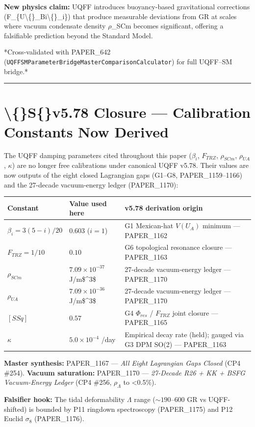 \documentclass[11pt]{article}
\begin{document}
\textbf{New physics claim:} UQFF introduces buoyancy-based gravitational corrections (F\_\{U\textbackslash\{\}\_Bi\textbackslash\{\}\_i\}) that produce measurable deviations from GR at scales where vacuum condensate density $\rho$\_SCm becomes significant, offering a falsifiable prediction beyond the Standard Model.

*Cross-validated with PAPER\_642 (\verb|UQFFSMParameterBridgeMasterComparisonCalculator|) for full UQFF--SM bridge.*

\noindent\rule{\textwidth}{0.4pt}

\section*{\textbackslash\{\}S\{\}v5.78 Closure --- Calibration Constants Now Derived}

The UQFF damping parameters cited throughout this paper ($\beta_i$, $F_{TRZ}$, $\rho_{SCm}$, $\rho_{UA}$, $\kappa$) are no longer free calibrations under canonical UQFF v5.78. Their values are now outputs of the eight closed Lagrangian gaps (G1--G8, PAPER\_1159--1166) and the 27-decade vacuum-energy ledger (PAPER\_1170):

\begin{center}
\begin{longtable}{lll}
\toprule
Constant & Value used here & v5.78 derivation origin \tabularnewline
\midrule
\endhead
$\beta_i = 3(5-i)/20$ & $0.603$ ($i=1$) & G1 Mexican-hat $V(U_A)$ minimum --- PAPER\_1162 \tabularnewline
$F_{TRZ} = 1/10$ & $0.10$ & G6 topological resonance closure --- PAPER\_1163 \tabularnewline
$\rho_{SCm}$ & $7.09\times10^{-37}$ J/m\$\textasciicircum{}3\$ & 27-decade vacuum-energy ledger --- PAPER\_1170 \tabularnewline
$\rho_{UA}$ & $7.09\times10^{-36}$ J/m\$\textasciicircum{}3\$ & 27-decade vacuum-energy ledger --- PAPER\_1170 \tabularnewline
$[SSq]$ & $0.57$ & G4 $\Phi_{res}$ / $F_{TRZ}$ joint closure --- PAPER\_1165 \tabularnewline
$\kappa$ & $5.0\times10^{-4}$ /day & Empirical decay rate (held); gauged via G3 DPM SO(2) --- PAPER\_1163 \tabularnewline
\bottomrule
\end{longtable}
\end{center}

\textbf{Master synthesis:} PAPER\_1167 --- \emph{All Eight Lagrangian Gaps Closed} (CP4 \#254). \textbf{Vacuum saturation:} PAPER\_1170 --- \emph{27-Decade R26 + KK + BSFG Vacuum-Energy Ledger} (CP4 \#256, $\rho_\Lambda$ to <0.5\%).

\textbf{Falsifier hook:} The tidal deformability $\Lambda$ range ($\sim 190$--$600$ GR vs UQFF-shifted) is bounded by P11 ringdown spectroscopy (PAPER\_1175) and P12 Euclid $\sigma_8$ (PAPER\_1176).
\end{document}
